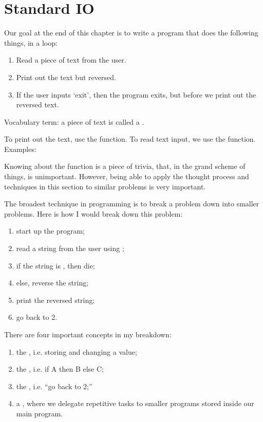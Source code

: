 \chapter{Standard IO}

Our goal at the end of this chapter is to write a program that does
the following things, in a loop:

\begin{enumerate}
\item Read a piece of text from the user.
\item Print out the text but reversed.
\item If the user inputs `exit', then the program exits, but before
  we print out the reversed text.
\end{enumerate}

Vocabulary term: a piece of text is called a .

To print out the text, use the  function. To read text
input, we use the  function. Examples:


Knowing about the function  is a piece of trivia, that,
in the grand scheme of things, is unimportant. However, being able to
apply the thought process and techniques in this section to similar
problems is very important.

The broadest technique in programming is to break a problem down into
smaller problems. Here is how I would break down this problem:

\begin{enumerate}
\item start up the program;
\item read a string from the user using ;
\item if the string is , then die;
\item else, reverse the string;
\item print the reversed string;
\item go back to 2.
\end{enumerate}

There are four important concepts in my breakdown:

\begin{enumerate}
\item the , i.e. storing and changing a value;
\item the , i.e. if A then B else C;
\item the , i.e. ``go back to 2;''
\item a , where we delegate repetitive tasks to
  smaller programs stored inside our main program.
\end{enumerate}

